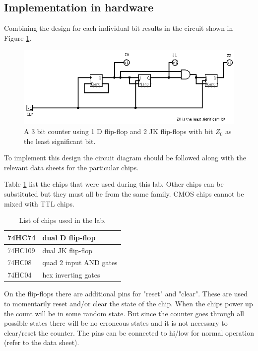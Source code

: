 \documentclass[12pt]{article}
\begin{document}

\subsection{Implementation in hardware}

Combining the design for each individual bit results in the circuit
shown in Figure \ref{fig:circ01}.

\begin{figure}[h!]
\center
\includegraphics[scale=0.5]{3bit-counter-1D-2JK}
\caption{A 3 bit counter using 1 D flip-flop and 2 JK flip-flops
with bit $Z_0$ as the least significant bit.}\label{fig:circ01}
\end{figure}

To implement this design the circuit diagram should be followed
along with the relevant data sheets for the particular chips.

Table \ref{tbl:ics} list the chips that were used during this lab.
Other chips can be substituted but they must all be from the same family.
CMOS chips cannot be mixed with TTL chips.

\begin{table}[h!]
\center
\begin{tabular}{|l|l|}
\hline
74HC74 & dual D flip-flop \\
\hline
74HC109 & dual JK flip-flop \\
\hline
74HC08 & quad 2 input AND gates \\
\hline
74HC04 & hex inverting gates \\
\hline
\end{tabular}
\caption{List of chips used in the lab.}
\label{tbl:ics}
\end{table}

On the flip-flops there are additional pins for "reset" and "clear".
These are used to momentarily reset and/or clear the state of the chip.
When the chips power up the count will be in some random state.
But since the counter goes through all possible states there will be
no erroneous states and it is not necessary to clear/reset the counter.
The pins can be connected to hi/low for normal operation (refer to the data sheet).
\end{document}
